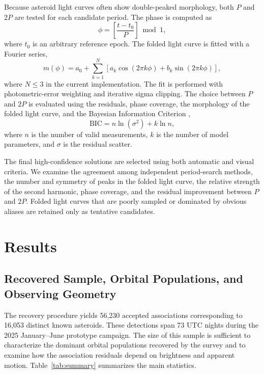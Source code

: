 \documentclass[referee]{raa}
\begin{document}
Because asteroid light curves often show double-peaked morphology, both \(P\) and \(2P\) are tested for each candidate period. The phase is computed as
\begin{equation}
\phi=\left[\frac{t-t_0}{P}\right]\bmod 1 ,
\end{equation}
where \(t_0\) is an arbitrary reference epoch. The folded light curve is fitted with a Fourier series,
\begin{equation}
m(\phi)=a_0+\sum_{k=1}^{N}
\left[a_k\cos(2\pi k\phi)+b_k\sin(2\pi k\phi)\right],
\end{equation}
where \(N\leq3\) in the current implementation. The fit is performed with photometric-error weighting and iterative sigma clipping. The choice between \(P\) and \(2P\) is evaluated using the residuals, phase coverage, the morphology of the folded light curve, and the Bayesian Information Criterion \citep{Schwarz1978},
\begin{equation}
\mathrm{BIC}=n\ln(\sigma^2)+k\ln n ,
\end{equation}
where \(n\) is the number of valid measurements, \(k\) is the number of model parameters, and \(\sigma\) is the residual scatter.

The final high-confidence solutions are selected using both automatic and visual criteria. We examine the agreement among independent period-search methods, the number and symmetry of peaks in the folded light curve, the relative strength of the second harmonic, phase coverage, and the residual improvement between \(P\) and \(2P\). Folded light curves that are poorly sampled or dominated by obvious aliases are retained only as tentative candidates.

\section{Results}
\label{sec:results}

\subsection{Recovered Sample, Orbital Populations, and Observing Geometry}

The recovery procedure yields 56,230 accepted associations corresponding to 16,053 distinct known asteroids. These detections span 73 UTC nights during the 2025 January--June prototype campaign. The size of this sample is sufficient to characterize the dominant orbital populations recovered by the survey and to examine how the association residuals depend on brightness and apparent motion. Table~\ref{tab:summary} summarizes the main statistics.
\end{document}
